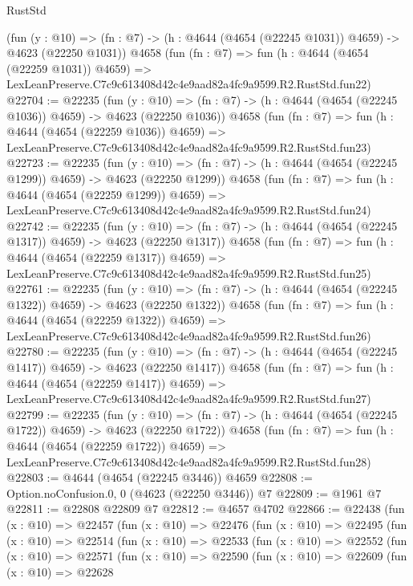 \begin{lexlean}{RustStd}
\begin{coremodule}
    (fun (y : @10) => (fn : @7) -> (h : @4644 (@4654 (@22245 @1031)) @4659) -> @4623 (@22250 @1031))
    @4658
    (fun (fn : @7) =>
    fun (h : @4644 (@4654 (@22259 @1031)) @4659) =>
    LexLeanPreserve.C7c9c613408d42c4e9aad82a4fc9a9599.R2.RustStd.fun22)
@22704 := @22235
    (fun (y : @10) => (fn : @7) -> (h : @4644 (@4654 (@22245 @1036)) @4659) -> @4623 (@22250 @1036))
    @4658
    (fun (fn : @7) =>
    fun (h : @4644 (@4654 (@22259 @1036)) @4659) =>
    LexLeanPreserve.C7c9c613408d42c4e9aad82a4fc9a9599.R2.RustStd.fun23)
@22723 := @22235
    (fun (y : @10) => (fn : @7) -> (h : @4644 (@4654 (@22245 @1299)) @4659) -> @4623 (@22250 @1299))
    @4658
    (fun (fn : @7) =>
    fun (h : @4644 (@4654 (@22259 @1299)) @4659) =>
    LexLeanPreserve.C7c9c613408d42c4e9aad82a4fc9a9599.R2.RustStd.fun24)
@22742 := @22235
    (fun (y : @10) => (fn : @7) -> (h : @4644 (@4654 (@22245 @1317)) @4659) -> @4623 (@22250 @1317))
    @4658
    (fun (fn : @7) =>
    fun (h : @4644 (@4654 (@22259 @1317)) @4659) =>
    LexLeanPreserve.C7c9c613408d42c4e9aad82a4fc9a9599.R2.RustStd.fun25)
@22761 := @22235
    (fun (y : @10) => (fn : @7) -> (h : @4644 (@4654 (@22245 @1322)) @4659) -> @4623 (@22250 @1322))
    @4658
    (fun (fn : @7) =>
    fun (h : @4644 (@4654 (@22259 @1322)) @4659) =>
    LexLeanPreserve.C7c9c613408d42c4e9aad82a4fc9a9599.R2.RustStd.fun26)
@22780 := @22235
    (fun (y : @10) => (fn : @7) -> (h : @4644 (@4654 (@22245 @1417)) @4659) -> @4623 (@22250 @1417))
    @4658
    (fun (fn : @7) =>
    fun (h : @4644 (@4654 (@22259 @1417)) @4659) =>
    LexLeanPreserve.C7c9c613408d42c4e9aad82a4fc9a9599.R2.RustStd.fun27)
@22799 := @22235
    (fun (y : @10) => (fn : @7) -> (h : @4644 (@4654 (@22245 @1722)) @4659) -> @4623 (@22250 @1722))
    @4658
    (fun (fn : @7) =>
    fun (h : @4644 (@4654 (@22259 @1722)) @4659) =>
    LexLeanPreserve.C7c9c613408d42c4e9aad82a4fc9a9599.R2.RustStd.fun28)
@22803 := @4644 (@4654 (@22245 @3446)) @4659
@22808 := Option.noConfusion.{0, 0} (@4623 (@22250 @3446)) @7
@22809 := @1961 @7
@22811 := @22808 @22809 @7
@22812 := @4657 @4702
@22866 := @22438
    (fun (x : @10) =>
    @22457
      (fun (x : @10) =>
      @22476
        (fun (x : @10) =>
        @22495
          (fun (x : @10) =>
          @22514
            (fun (x : @10) =>
            @22533
              (fun (x : @10) =>
              @22552
                (fun (x : @10) =>
                @22571
                  (fun (x : @10) =>
                  @22590
                    (fun (x : @10) =>
                    @22609
                      (fun (x : @10) =>
                      @22628

\end{coremodule}
\end{lexlean}
